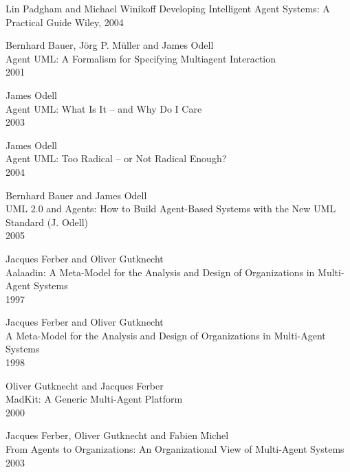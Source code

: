 \begin{thebibliography}{99}
Lin Padgham and Michael Winikoff
Developing Intelligent Agent Systems: A Practical Guide
Wiley, 2004


Bernhard Bauer, J\"{o}rg P. M\"{u}ller and James Odell\\
Agent UML: A Formalism for Specifying Multiagent Interaction\\
2001

James Odell\\
Agent UML: What Is It -- and Why Do I Care\\
2003

James Odell\\
Agent UML: Too Radical -- or Not Radical Enough?\\
2004

Bernhard Bauer and James Odell\\
UML 2.0 and Agents: How to Build Agent-Based Systems with the New UML Standard (J. Odell)\\
2005


Jacques Ferber and Oliver Gutknecht\\
Aalaadin: A Meta-Model for the Analysis and Design of Organizations in Multi-Agent Systems\\
1997

Jacques Ferber and Oliver Gutknecht\\
A Meta-Model for the Analysis and Design of Organizations in Multi-Agent Systems\\
1998

Oliver Gutknecht and Jacques Ferber\\
MadKit: A Generic Multi-Agent Platform\\
2000

Jacques Ferber, Oliver Gutknecht and Fabien Michel\\
From Agents to Organizations: An Organizational View of Multi-Agent Systems\\
2003



\end{thebibliography}
